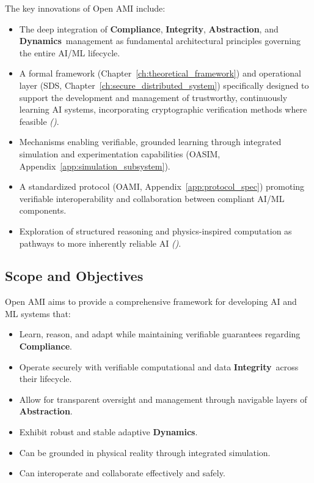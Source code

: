 \documentclass[12pt,a4paper]{report}
\renewcommand{\citep}[1]{\textit{\scriptsize{(\cite{#1})}}}
\newcommand{\Compliance}{\textbf{Compliance}}
\newcommand{\Integrity}{\textbf{Integrity}}
\newcommand{\Abstraction}{\textbf{Abstraction}}
\newcommand{\Dynamics}{\textbf{Dynamics}}
\begin{document}
	The key innovations of Open AMI include:
	\begin{itemize}[leftmargin=*]
		\item The deep integration of \Compliance, \Integrity, \Abstraction, and \Dynamics\ management as fundamental architectural principles governing the entire AI/ML lifecycle.
		\item A formal framework (Chapter~\ref{ch:theoretical_framework}) and operational layer (SDS, Chapter~\ref{ch:secure_distributed_system}) specifically designed to support the development and management of trustworthy, continuously learning AI systems, incorporating cryptographic verification methods where feasible \citep{Peng2025ZKMLSurvey, Jia2021ProofOfLearning}.
		\item Mechanisms enabling verifiable, grounded learning through integrated simulation and experimentation capabilities (OASIM, Appendix~\ref{app:simulation_subsystem}).
		\item A standardized protocol (OAMI, Appendix~\ref{app:protocol_spec}) promoting verifiable interoperability and collaboration between compliant AI/ML components.
		\item Exploration of structured reasoning and physics-inspired computation as pathways to more inherently reliable AI \citep{Cao_PhyDRL_2024}.
	\end{itemize}
	
	\subsection{Scope and Objectives}
	Open AMI aims to provide a comprehensive framework for developing AI and ML systems that:
	
	\begin{itemize}[leftmargin=*]
		\item Learn, reason, and adapt while maintaining verifiable guarantees regarding \Compliance.
		\item Operate securely with verifiable computational and data \Integrity\ across their lifecycle.
		\item Allow for transparent oversight and management through navigable layers of \Abstraction.
		\item Exhibit robust and stable adaptive \Dynamics.
		\item Can be grounded in physical reality through integrated simulation.
		\item Can interoperate and collaborate effectively and safely.
	\end{itemize}
	
\end{document}

